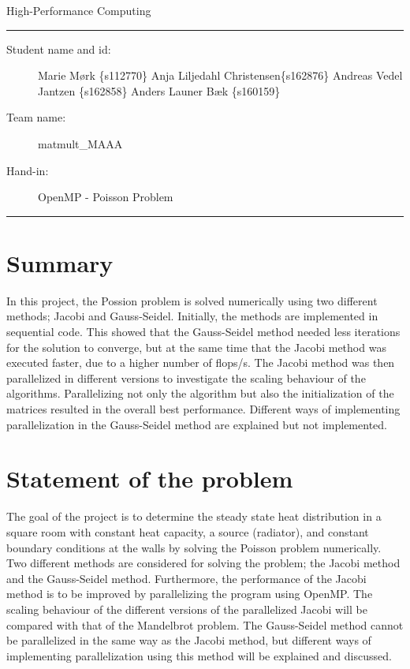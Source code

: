\begin{center}
{{\Large \sc High-Performance Computing}}
\end{center}
\rule{\textwidth}{1pt}
\begin{description}
\item[Student name and id:] Marie Mørk \{s112770\} Anja Liljedahl Christensen\{s162876\}
 Andreas Vedel Jantzen \{s162858\}
 Anders Launer Bæk \{s160159\}
\item[Team name:] matmult\_MAAA
\item[Hand-in:] OpenMP - Poisson Problem
\end{description}
\rule{\textwidth}{1pt}

\section{Summary}
In this project, the Possion problem is solved numerically using two different methods; Jacobi and Gauss-Seidel. Initially, the methods are implemented in sequential code. This showed that the Gauss-Seidel method needed less iterations for the solution to converge, but at the same time that the Jacobi method was executed faster, due to a higher number of flops/s. The Jacobi method was then parallelized in different versions to investigate the scaling behaviour of the algorithms. Parallelizing not only the algorithm but also the initialization of the matrices resulted in the overall best performance. Different ways of implementing parallelization in the Gauss-Seidel method are explained but not implemented. 

\section{Statement of the problem}
The goal of the project is to determine the steady state heat distribution in a square room with constant heat capacity, a source (radiator), and constant boundary conditions at the walls by solving the Poisson problem numerically. Two different methods are considered for solving the problem; the Jacobi method and the Gauss-Seidel method. Furthermore, the performance of the Jacobi method is to be improved by parallelizing the program using OpenMP. The scaling behaviour of the different versions of the parallelized Jacobi will be compared with that of the Mandelbrot problem. The Gauss-Seidel method cannot be parallelized in the same way as the Jacobi method, but different ways of implementing parallelization using this method will be explained and discussed.\\


